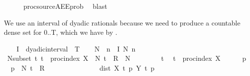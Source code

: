 \begin{isabellebody}
\ \ \ \ \isamarkupfalse%
\ proc{\isacharunderscore}{\kern0pt}source{\isachardot}{\kern0pt}AE{\isacharunderscore}{\kern0pt}E{\isacharunderscore}{\kern0pt}prob\ \isamarkupfalse%
\ blast%
\begin{isamarkuptext}%
We use an interval of dyadic rationals because we need to produce a countable dense set
  for {0..T}, which we have by .%
\end{isamarkuptext}\isamarkuptrue%
\ \ \isamarkupfalse%
\ {\isacharquery}{\kern0pt}I\ {\isacharequal}{\kern0pt}\ {\isachardoublequoteopen}dyadic{\isacharunderscore}{\kern0pt}interval\ {}\ T{\isachardoublequoteclose}\isanewline
\ \ \isamarkupfalse%
\ {\isacharquery}{\kern0pt}N{\isacharprime}{\kern0pt}\ {\isacharequal}{\kern0pt}\ {\isachardoublequoteopen}{\isasymUnion}n\ {\isasymin}\ {\isacharquery}{\kern0pt}I{\isachardot}{\kern0pt}\ N\ n{\isachardoublequoteclose}\isanewline
\ \ \isamarkupfalse%
\ N{\isacharunderscore}{\kern0pt}subset{\isacharcolon}{\kern0pt}\ {\isachardoublequoteopen}{\isasymAnd}t{\isachardot}{\kern0pt}\ t\ {\isasymin}\ proc{\isacharunderscore}{\kern0pt}index\ X\ {\isasymLongrightarrow}\ N\ t\ {\isasyminter}\ R\ {\isasymsubseteq}\ {\isacharquery}{\kern0pt}N{\isacharprime}{\kern0pt}{\isachardoublequoteclose}\isanewline
\ \ \isamarkupfalse%
\isanewline
\ \ \ \ \isamarkupfalse%
\ t\ \isamarkupfalse%
\ {\isachardoublequoteopen}t\ {\isasymin}\ proc{\isacharunderscore}{\kern0pt}index\ X{\isachardoublequoteclose}\isanewline
\ \ \ \ \isamarkupfalse%
\ p\ \isamarkupfalse%
\ {\isacharasterisk}{\kern0pt}{\isacharcolon}{\kern0pt}\ {\isachardoublequoteopen}p\ {\isasymin}\ N\ t\ {\isasyminter}\ R{\isachardoublequoteclose}\isanewline
\ \ \ \ \isamarkupfalse%
\ \isamarkupfalse%
\ {\isasymepsilon}\ \ {\isasymepsilon}{\isacharcolon}{\kern0pt}\ {\isachardoublequoteopen}{}\ {\isacharless}{\kern0pt}\ {\isasymepsilon}{\isachardoublequoteclose}\ {\isachardoublequoteopen}{\isasymepsilon}\ {\isacharequal}{\kern0pt}\ dist\ {\isacharparenleft}{\kern0pt}X\ t\ p{\isacharparenright}{\kern0pt}\ {\isacharparenleft}{\kern0pt}Y\ t\ p{\isacharparenright}{\kern0pt}{\isachardoublequoteclose}\isanewline

\end{isabellebody}
